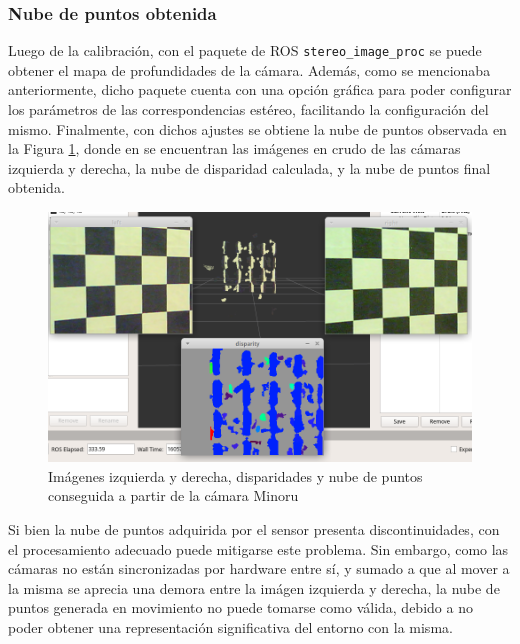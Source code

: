 \subsubsection{Nube de puntos obtenida}
Luego de la calibración, con el paquete de ROS \texttt{stereo\_image\_proc} se puede obtener el mapa de profundidades de la cámara. Además, como se mencionaba anteriormente, dicho paquete cuenta con una opción gráfica para poder configurar los parámetros de las correspondencias estéreo, facilitando la configuración del mismo. Finalmente, con dichos ajustes se obtiene la nube de puntos observada en la Figura \ref{fig:minorupointcloud}, donde en se encuentran las imágenes en crudo de las cámaras izquierda y derecha, la nube de disparidad calculada, y la nube de puntos final obtenida.

\begin{figure}[!ht]
    \centering
    \includegraphics[width=\linewidth]{Img/MinoruPointCloud.png}
    \caption{Imágenes izquierda y derecha, disparidades y nube de puntos conseguida a partir de la cámara Minoru}
    \label{fig:minorupointcloud}
\end{figure}

Si bien la nube de puntos adquirida por el sensor presenta discontinuidades, con el procesamiento adecuado puede mitigarse este problema. Sin embargo, como las cámaras no están sincronizadas por hardware entre sí, y sumado a que al mover a la misma se aprecia una demora entre la imágen izquierda y derecha, la nube de puntos generada en movimiento no puede tomarse como válida, debido a no poder obtener una representación significativa del entorno con la misma.

